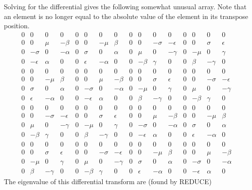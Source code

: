 \documentclass[12pt]{article}
\begin{document}
Solving for the differential gives the following somewhat unusual array.
Note that an element is no longer equal to the absolute value of the element
in its transpose position.
\begin{displaymath}
\begin{array}{cccccccccccccccc}
0 & 0 & 0 & 0 & 0 & 0 & 0 & 0 &  0 & 0 & 0 & 0 & 0 & 0 & 0 & 0 \\
0 & 0 & \mu &-\beta & 0 & 0 &-\mu & \beta &  0 & 0 &-\sigma &-\epsilon & 0 & 0 & \sigma & \epsilon \\
0 &-\sigma & 0 &-\alpha & 0 & \sigma & 0 & \alpha &  0 & \mu & 0 &-\gamma & 0 &-\mu & 0 & \gamma \\
0 &-\epsilon & \alpha & 0 & 0 & \epsilon &-\alpha & 0 &  0 &-\beta & \gamma & 0 & 0 & \beta &-\gamma & 0 \\
0 & 0 & 0 & 0 & 0 & 0 & 0 & 0 &  0 & 0 & 0 & 0 & 0 & 0 & 0 & 0 \\
0 & 0 &-\mu & \beta & 0 & 0 & \mu &-\beta &  0 & 0 & \sigma & \epsilon & 0 & 0 &-\sigma &-\epsilon \\
0 & \sigma & 0 & \alpha & 0 &-\sigma & 0 &-\alpha &  0 &-\mu & 0 & \gamma & 0 & \mu & 0 &-\gamma \\
0 & \epsilon &-\alpha & 0 & 0 &-\epsilon & \alpha & 0 &  0 & \beta &-\gamma & 0 & 0 &-\beta & \gamma & 0 \\
0 & 0 & 0 & 0 & 0 & 0 & 0 & 0 &  0 & 0 & 0 & 0 & 0 & 0 & 0 & 0 \\
0 & 0 &-\sigma &-\epsilon & 0 & 0 & \sigma & \epsilon &  0 & 0 & \mu &-\beta & 0 & 0 &-\mu & \beta \\
0 & \mu & 0 &-\gamma & 0 &-\mu & 0 & \gamma &  0 &-\sigma & 0 &-\alpha & 0 & \sigma & 0 & \alpha \\
0 &-\beta & \gamma & 0 & 0 & \beta &-\gamma & 0 &  0 &-\epsilon & \alpha & 0 & 0 & \epsilon &-\alpha & 0 \\
0 & 0 & 0 & 0 & 0 & 0 & 0 & 0 &  0 & 0 & 0 & 0 & 0 & 0 & 0 & 0 \\
0 & 0 & \sigma & \epsilon & 0 & 0 &-\sigma &-\epsilon &  0 & 0 &-\mu & \beta & 0 & 0 & \mu &-\beta \\
0 &-\mu & 0 & \gamma & 0 & \mu & 0 &-\gamma &  0 & \sigma & 0 & \alpha & 0 &-\sigma & 0 &-\alpha \\
0 & \beta &-\gamma & 0 & 0 &-\beta & \gamma & 0 &  0 & \epsilon &-\alpha & 0 & 0 &-\epsilon & \alpha & 0 
\end{array}
\end{displaymath}
 The eigenvalue of this differential transform are (found by REDUCE)
\end{document}
